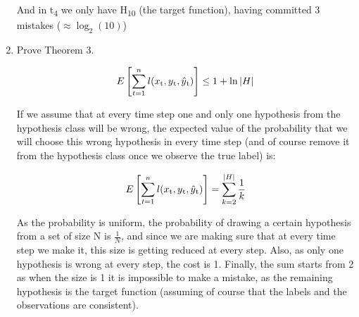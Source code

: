 \documentclass{article}
\begin{document}
\begin{enumerate}
And in t\textsubscript{4} we only have H\textsubscript{10} (the target function), having committed 3 mistakes ($\approx \log_2(10)$)\\

\item Prove Theorem 3.

\begin{equation}
E\left[\sum_{t=1}^{n} l(x\textsubscript{t}, y\textsubscript{t}, \hat{y}\textsubscript{t})\right] \leq 1 + \ln|H|
\end{equation}

If we assume that at every time step one and only one hypothesis from the hypothesis class will be wrong, the expected value of the probability that we will choose this wrong hypothesis in every time step (and of course remove it from the hypothesis class once we observe the true label) is:

\begin{equation}
E\left[\sum_{t=1}^{n} l(x\textsubscript{t}, y\textsubscript{t}, \hat{y}\textsubscript{t})\right] = \sum_{k=2}^{|H|}\frac{1}{k}
\end{equation}

As the probability is uniform, the probability of drawing a certain hypothesis from a set of size N is $\frac{1}{N}$, and since we are making sure that at every time step we make it, this size is getting reduced at every step. Also, as only one hypothesis is wrong at every step, the cost is 1. Finally, the sum starts from 2 as when the size is 1 it is impossible to make a mistake, as the remaining hypothesis is the target function (assuming of course that the labels and the observations are consistent).

\end{enumerate}
\end{document}
